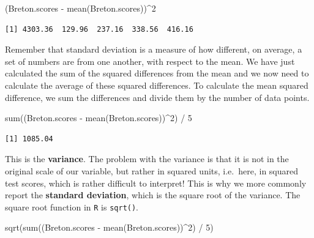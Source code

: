 \documentclass[
  letterpaper,
  DIV=11,
  numbers=noendperiod]{scrreprt}
\newenvironment{Shaded}{\begin{snugshade}}{\end{snugshade}}
\newcommand{\DecValTok}[1]{\textcolor[rgb]{0.68,0.00,0.00}{#1}}
\newcommand{\FunctionTok}[1]{\textcolor[rgb]{0.28,0.35,0.67}{#1}}
\newcommand{\NormalTok}[1]{\textcolor[rgb]{0.00,0.23,0.31}{#1}}
\newcommand{\SpecialCharTok}[1]{\textcolor[rgb]{0.37,0.37,0.37}{#1}}
\begin{document}
\begin{Shaded}
\begin{Highlighting}[]
\NormalTok{(Breton.scores }\SpecialCharTok{{-}} \FunctionTok{mean}\NormalTok{(Breton.scores))}\SpecialCharTok{\^{}}\DecValTok{2}
\end{Highlighting}
\end{Shaded}

\begin{verbatim}
[1] 4303.36  129.96  237.16  338.56  416.16
\end{verbatim}

Remember that standard deviation is a measure of how different, on
average, a set of numbers are from one another, with respect to the
mean. We have just calculated the sum of the squared differences from
the mean and we now need to calculate the average of these squared
differences. To calculate the mean squared difference, we sum the
differences and divide them by the number of data points.

\begin{Shaded}
\begin{Highlighting}[]
\FunctionTok{sum}\NormalTok{((Breton.scores }\SpecialCharTok{{-}} \FunctionTok{mean}\NormalTok{(Breton.scores))}\SpecialCharTok{\^{}}\DecValTok{2}\NormalTok{) }\SpecialCharTok{/} \DecValTok{5}
\end{Highlighting}
\end{Shaded}

\begin{verbatim}
[1] 1085.04
\end{verbatim}

This is the \textbf{variance}. The problem with the variance is that it
is not in the original scale of our variable, but rather in squared
units, i.e.~here, in squared test scores, which is rather difficult to
interpret! This is why we more commonly report the \textbf{standard
deviation}, which is the square root of the variance. The square root
function in \texttt{R} is \texttt{sqrt()}.

\begin{Shaded}
\begin{Highlighting}[]
\FunctionTok{sqrt}\NormalTok{(}\FunctionTok{sum}\NormalTok{((Breton.scores }\SpecialCharTok{{-}} \FunctionTok{mean}\NormalTok{(Breton.scores))}\SpecialCharTok{\^{}}\DecValTok{2}\NormalTok{) }\SpecialCharTok{/} \DecValTok{5}\NormalTok{)}
\end{Highlighting}
\end{Shaded}
\end{document}
